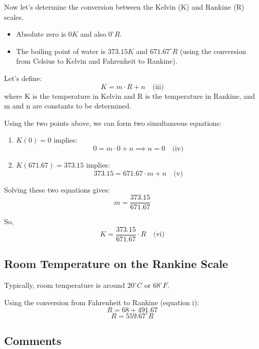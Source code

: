 \documentclass[12pt]{article}
\begin{document}
Now let's determine the conversion between the Kelvin (K) and Rankine (R) scales.

\begin{itemize}
    \item Absolute zero is $0K$ and also $0^\circ R$.
    \item The boiling point of water is $373.15K$ and $671.67^\circ R$ (using the conversion from Celsius to Kelvin and Fahrenheit to Rankine).
\end{itemize}

Let's define:
\begin{equation}
    K = m \cdot R + n \quad \text{(iii)}
\end{equation}
where K is the temperature in Kelvin and R is the temperature in Rankine, and m and n are constants to be determined.

Using the two points above, we can form two simultaneous equations:
\begin{enumerate}
    \item \(K(0) = 0\) implies:
    \begin{equation}
        0 = m \cdot 0 + n \implies n = 0 \quad \text{(iv)}
    \end{equation}
    \item \(K(671.67) = 373.15\) implies:
    \begin{equation}
        373.15 = 671.67 \cdot m + n \quad \text{(v)}
    \end{equation}
\end{enumerate}

Solving these two equations gives:
\[ m = \frac{373.15}{671.67} \]

So,
\begin{equation}
    K = \frac{373.15}{671.67} \cdot R \quad \text{(vi)}
\end{equation}

\subsection*{Room Temperature on the Rankine Scale}

Typically, room temperature is around $20^\circ C$ or $68^\circ F$.

Using the conversion from Fahrenheit to Rankine (equation i):
\[ R = 68 + 491.67 \]
\[ R = 559.67^\circ R \]

\subsection*{Comments}
\end{document}
